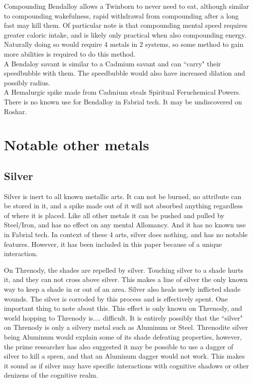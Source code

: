 \documentclass[conference]{IEEEtran}
\begin{document}
Compounding Bendalloy allows a Twinborn to never need to eat, although similar to compounding wakefulness, rapid withdrawal from compounding after a long fast may kill them.\cite{TFE-CH38}\cite{AoL-CH13}  Of particular note is that compounding mental speed requires greater caloric intake, and is likely only practical when also compounding energy.  Naturally doing so would require 4 metals in 2 systems, so some method to gain more abilities is required to do this method.\\

A Bendaloy savant is similar to a Cadmium savant and can ``carry" their speedbubble with them.\cite{Bubble-move}  The speedbubble would also have increased dilation and possibly radius.\cite{bubble-savant}\\

A Hemalurgic spike made from Cadmium steals Spiritual Feruchemical Powers.\cite{HE-TB}\\

There is no known use for Bendalloy in Fabrial tech.  It may be undiscovered on Roshar.

\section*{Notable other metals}
\subsection*{Silver}
Silver is inert to all known metallic arts.\cite{HoA-CH60}  It can not be burned,\cite{AL-TB} no attribute can be stored in it,\cite{FE-TB} and a spike made out of it will not absorbed anything regardless of where it is placed.\cite{HE-TB}  Like all other metals it can be pushed and pulled by Steel/Iron,\cite{SoS-CH2} and has no effect on any mental Allomancy.\cite{silver-no-special}  And it has no known use in Fabrial tech.  In context of these 4 arts, silver does nothing, and has no notable features.\cite{no-silver-al}  However, it has been included in this paper because of a unique interaction. 

 On Threnody, the shades are repelled by silver.\cite{SFSFH-CH3}  Touching silver to a shade hurts it,\cite{SFSFH-CH1} and they can not cross above silver.\cite{SFSFH-CH3}  This makes a line of silver the only known way to keep a shade in or out of an area.\cite{SFSFH-CH1}  Silver also heals newly inflicted shade wounds.\cite{SFSFH-CH2}  The silver is corroded by this process and is effectively spent.\cite{SFSFH-CH1}  
One important thing to note about this.  This effect is only known on Threnody, and world hopping to Threnody is.... difficult.  It is entirely possibly that the ``silver" on Threnody is only a silvery metal such as Aluminum or Steel.  Threnodite silver being Aluminum would explain some of its shade defeating properties, however, the prime researcher has also suggested it may be possible to use a dagger of silver to kill a spren, and that an Aluminum dagger would not work.\cite{silver-spren}  This makes it sound as if silver may have specific interactions with cognitive shadows or other denizens of the cognitive realm.
\end{document}
